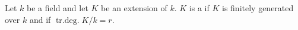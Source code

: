 Let $k$ be a field and let $K$ be an extension of $k$. $K$ is a  if $K$ is finitely generated over $k$ and if $\operatorname{tr. deg.} K/k = r$.
